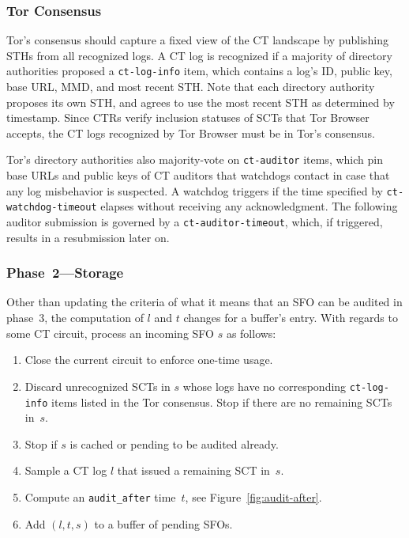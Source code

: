 \subsubsection{Tor Consensus} \label{sec:auditor:design:consensus}
Tor's consensus should capture a fixed view of the CT landscape by publishing
STHs from all recognized logs.  A CT log is recognized if a majority of directory
authorities proposed a \texttt{ct-log-info} item, which contains a log's ID,
public key, base URL, MMD, and most recent STH.  Note that each directory
authority proposes its own STH, and agrees to use the most recent STH as
determined by timestamp.  Since CTRs verify inclusion statuses of SCTs
that Tor Browser accepts, the CT logs recognized by Tor Browser must be in
Tor's consensus.

Tor's directory authorities also majority-vote on \texttt{ct-auditor} items,
which pin base URLs and public keys of CT auditors that watchdogs contact in
case that any log misbehavior is suspected.  A watchdog triggers if the time
specified by \texttt{ct-watchdog-timeout} elapses without receiving any
acknowledgment.  The following auditor submission is governed by a
\texttt{ct-auditor-timeout}, which, if triggered, results in a resubmission
later on.

\subsubsection{Phase~2---Storage} \label{sec:auditor:design:phase2}
Other than updating the criteria of what it means that an SFO can be audited
in phase~3, the computation of $l$ and $t$ changes for a buffer's entry.  With
regards to some CT circuit, process an incoming SFO $s$ as follows:
\begin{enumerate}
	\item\label{enm:ext:storage:close} Close the current circuit to enforce
		one-time usage.
	\item\label{enm:ext:storage:unrecognized} Discard unrecognized SCTs in $s$
		whose logs have no corresponding \texttt{ct-log-info} items listed in
		the Tor consensus.  Stop if there are no remaining SCTs in~$s$.
	\item\label{enm:ext:storage:cached}
		Stop if $s$ is cached or pending to be audited already.
	\item\label{enm:ext:storage:fix-log} Sample a CT log $l$ that issued a
		remaining SCT in~$s$.
	\item\label{enm:storage:audit-after} Compute an \texttt{audit\_after}
		time~$t$, see Figure~\ref{fig:audit-after}.
	\item\label{enm:storage:store} Add $(l,t,s)$ to a buffer of pending SFOs.
\end{enumerate}

